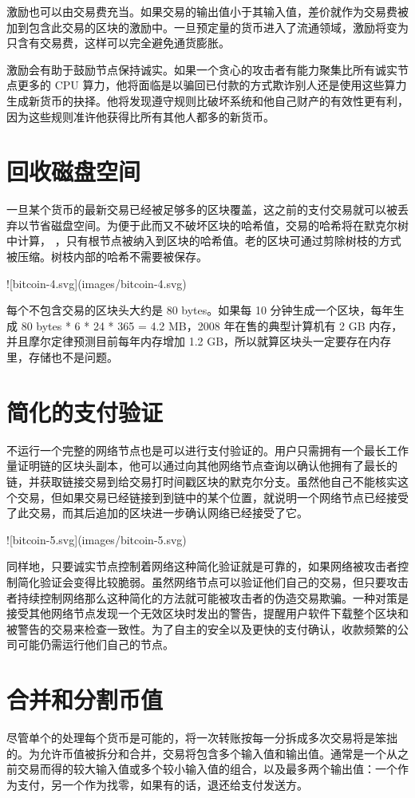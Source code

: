 \documentclass{article}
\begin{document}
激励也可以由交易费充当。如果交易的输出值小于其输入值，差价就作为交易费被加到包含此交易的区块的激励中。一旦预定量的货币进入了流通领域，激励将变为只含有交易费，这样可以完全避免通货膨胀。

激励会有助于鼓励节点保持诚实。如果一个贪心的攻击者有能力聚集比所有诚实节点更多的 CPU 算力，他将面临是以骗回已付款的方式欺诈别人还是使用这些算力生成新货币的抉择。他将发现遵守规则比破坏系统和他自己财产的有效性更有利，因为这些规则准许他获得比所有其他人都多的新货币。

\section{回收磁盘空间}
一旦某个货币的最新交易已经被足够多的区块覆盖，这之前的支付交易就可以被丢弃以节省磁盘空间。为便于此而又不破坏区块的哈希值，交易的哈希将在默克尔树中计算， \cite{Merkle}\cite{Massias}\cite{Stornetta}，只有根节点被纳入到区块的哈希值。老的区块可通过剪除树枝的方式被压缩。树枝内部的哈希不需要被保存。

![bitcoin-4.svg](images/bitcoin-4.svg)

每个不包含交易的区块头大约是 80 bytes。如果每 10 分钟生成一个区块，每年生成 80 bytes * 6 * 24 * 365 = 4.2 MB，2008 年在售的典型计算机有 2 GB 内存，并且摩尔定律预测目前每年内存增加 1.2 GB，所以就算区块头一定要存在内存里，存储也不是问题。

\section{简化的支付验证}
不运行一个完整的网络节点也是可以进行支付验证的。用户只需拥有一个最长工作量证明链的区块头副本，他可以通过向其他网络节点查询以确认他拥有了最长的链，并获取链接交易到给交易打时间戳区块的默克尔分支。虽然他自己不能核实这个交易，但如果交易已经链接到到链中的某个位置，就说明一个网络节点已经接受了此交易，而其后追加的区块进一步确认网络已经接受了它。

![bitcoin-5.svg](images/bitcoin-5.svg)

同样地，只要诚实节点控制着网络这种简化验证就是可靠的，如果网络被攻击者控制简化验证会变得比较脆弱。虽然网络节点可以验证他们自己的交易，但只要攻击者持续控制网络那么这种简化的方法就可能被攻击者的伪造交易欺骗。一种对策是接受其他网络节点发现一个无效区块时发出的警告，提醒用户软件下载整个区块和被警告的交易来检查一致性。为了自主的安全以及更快的支付确认，收款频繁的公司可能仍需运行他们自己的节点。

\section{合并和分割币值}
尽管单个的处理每个货币是可能的，将一次转账按每一分拆成多次交易将是笨拙的。为允许币值被拆分和合并，交易将包含多个输入值和输出值。通常是一个从之前交易而得的较大输入值或多个较小输入值的组合，以及最多两个输出值：一个作为支付，另一个作为找零，如果有的话，退还给支付发送方。
\end{document}
